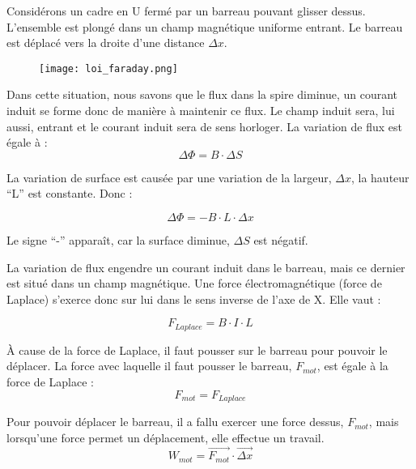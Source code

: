 Considérons un cadre en U fermé par un barreau pouvant glisser dessus. L'ensemble est plongé dans un champ magnétique uniforme entrant. Le barreau est déplacé vers la droite d'une distance \(\Delta x\).\begin{figure}[h!]
    \centering
    \texttt{[image: loi\_faraday.png]}
    \label{loi_faraday}
\end{figure}

\newpage

Dans cette situation, nous savons que le flux dans la spire diminue, un courant induit se forme donc de manière à maintenir ce flux. Le champ induit sera, lui aussi, entrant et le courant induit sera de sens horloger.
La variation de flux est égale à :
\begin{equation}\label{faraday_1}
    \Delta \Phi = B \cdot \Delta S
\end{equation}

La variation de surface est causée par une variation de la largeur, \(\Delta x\), la hauteur \enquote{L} est constante. Donc :

\begin{equation}\label{faraday_2}
    \Delta \Phi = - B \cdot L \cdot \Delta x
\end{equation}

Le signe \enquote{-} apparaît, car la surface diminue,  \(\Delta S\) est négatif.

La variation de flux engendre un courant induit dans le barreau, mais ce dernier est situé dans un champ magnétique. Une force électromagnétique (force de Laplace) s'exerce donc sur lui dans le sens inverse de l'axe de X. Elle vaut :

\begin{equation}\label{faraday_3}
    F_{Laplace} = B \cdot I \cdot L
\end{equation}

À cause de la force de Laplace, il faut pousser sur le barreau pour pouvoir le déplacer. La force avec laquelle il faut pousser le barreau, \(F_{mot}\), est égale à la force de Laplace :
\begin{equation}\label{faraday_4}
    F_{mot}= F_{Laplace}
\end{equation}

Pour pouvoir déplacer le barreau, il a fallu exercer une force dessus, \(F_{mot}\), mais lorsqu'une force permet un déplacement, elle effectue un travail.
\begin{equation}\label{faraday_5}
    W_{mot} = \vec{F_{mot}} \cdot \vec{\Delta x}
\end{equation}

